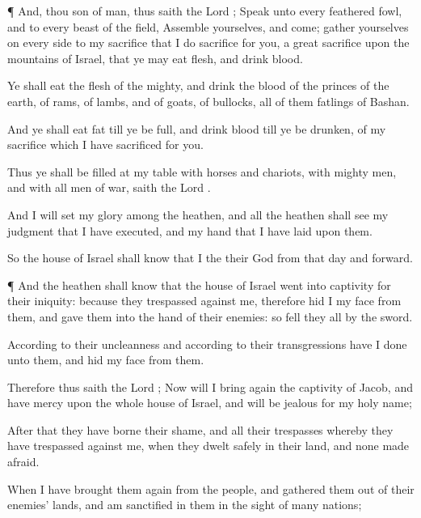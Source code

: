 {\par }{\PP {}¶ And, thou
son of
man, thus
saith the
Lord
{};
Speak unto every
feathered
fowl, and to every
beast of the
field,
Assemble yourselves, and
come;
gather yourselves on every
side to my
sacrifice that I do
sacrifice for you,
{} a
great
sacrifice upon the
mountains of
Israel, that ye may
eat
flesh, and
drink
blood.

Ye shall
eat the
flesh of the
mighty, and
drink the
blood of the
princes of the
earth, of
rams, of
lambs, and of
goats, of
bullocks, all of them
fatlings of
Bashan.

And ye shall
eat
fat till ye be
full, and
drink
blood till ye be
drunken, of my
sacrifice which I have
sacrificed for you.

Thus ye shall be
filled at my
table with
horses and
chariots, with mighty
men, and with all
men of
war,
saith the
Lord
{}.

And I will
set my
glory among the
heathen, and all the
heathen shall
see my
judgment that I have
executed, and my
hand that I have
laid upon them.

So the
house of
Israel shall
know that I
{} the
{} their
God from that
day and
forward.


\par }{\PP {}¶ And the
heathen shall
know that the
house of
Israel went into
captivity for their
iniquity: because they
trespassed against me, therefore
hid I my
face from them, and
gave them into the
hand of their
enemies: so
fell they all by the
sword.

According to their
uncleanness and according to their
transgressions have I
done unto them, and
hid my
face from them.

Therefore thus
saith the
Lord
{}; Now will I bring
again the
captivity of
Jacob, and have
mercy upon the whole
house of
Israel, and will be
jealous for my
holy
name;

After that they have
borne their
shame, and all their
trespasses whereby they have
trespassed against me, when they
dwelt
safely in their
land, and none made
{}
afraid.

When I have brought them
again from the
people, and
gathered them out of their
enemies’
lands, and am
sanctified in them in the
sight of
many
nations;

}
